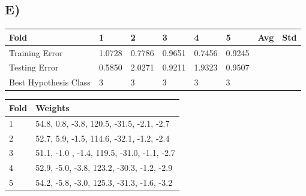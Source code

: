 \documentclass{report}
\begin{document}
\subsection*{E)}
\begin{center}
    \begin{tabular}{| l | l | l | l | l | l | l | l |}
    \hline
    Fold & 1 & 2 & 3 & 4 & 5 & Avg & Std \\ \hline
    Training Error & 1.0728 & 0.7786 & 0.9651 & 0.7456 & 0.9245 & &  \\ \hline
    Testing Error & 0.5850 & 2.0271 & 0.9211 & 1.9323 & 0.9507 & & \\ \hline
    Best Hypothesis Class & 3 & 3 & 3 & 3 & 3 & & \\ \hline
    \end{tabular}
\end{center}
\begin{center}
    \begin{tabular}{| l | l |}
    \hline
    Fold & Weights \\ \hline
    1 & 54.8,    0.8,   -3.8,  120.5,
         -31.5,   -2.1,   -2.7 \\ \hline
    2 & 52.7,    5.9,   -1.5,  114.6,
         -32.1,   -1.2,   -2.4 \\ \hline
    3 & 51.1,   -1.0 ,   -1.4,  119.5,
         -31.0,   -1.1,   -2.7 \\ \hline
    4 & 52.9,   -5.0,   -3.8,  123.2,
         -30.3,   -1.2,   -2.9 \\ \hline
    5 & 54.2,   -5.8,   -3.0,  125.3,
         -31.3,   -1.6,   -3.2 \\ \hline
    \end{tabular}
\end{center}
\end{document}
